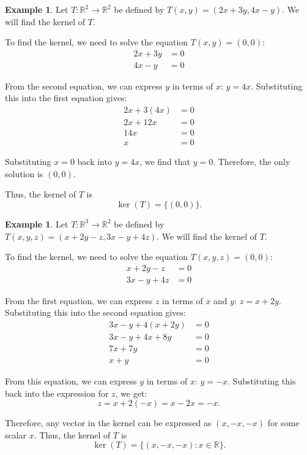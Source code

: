 \documentclass[11pt]{article}
\theoremstyle{definition}
\newtheorem{example}[definition]{Example}
\theoremstyle{plain}
\theoremstyle{remark}
\begin{document}
\begin{example}\label{ex:ker1}
    Let $T: \mathbb{R}^2 \to \mathbb{R}^2$ be defined by $T(x, y) = (2x + 3y, 4x - y)$. We will find the kernel of $T$.

    To find the kernel, we need to solve the equation $T(x, y) = (0, 0)$:
    \begin{align*}
        2x + 3y &= 0 \\
        4x - y &= 0
    \end{align*}

    From the second equation, we can express $y$ in terms of $x$: $y = 4x$. Substituting this into the first equation gives:
    \begin{align*}
        2x + 3(4x) &= 0 \\
        2x + 12x &= 0 \\
        14x &= 0 \\
        x &= 0
    \end{align*}

    Substituting $x = 0$ back into $y = 4x$, we find that $y = 0$. Therefore, the only solution is $(0, 0)$.

    Thus, the kernel of $T$ is
    \[\ker(T) = \{(0, 0)\}.\]
\end{example}

\begin{example}\label{ex:ker2}
    Let $T: \mathbb{R}^3 \to \mathbb{R}^2$ be defined by $T(x, y, z) = (x + 2y - z, 3x - y + 4z)$. We will find the kernel of $T$.

    To find the kernel, we need to solve the equation $T(x, y, z) = (0, 0)$:
    \begin{align*}
        x + 2y - z &= 0 \\
        3x - y + 4z &= 0
    \end{align*}

    From the first equation, we can express $z$ in terms of $x$ and $y$: $z = x + 2y$. Substituting this into the second equation gives:
    \begin{align*}
        3x - y + 4(x + 2y) &= 0 \\
        3x - y + 4x + 8y &= 0 \\
        7x + 7y &= 0 \\
        x + y &= 0
    \end{align*}

    From this equation, we can express $y$ in terms of $x$: $y = -x$. Substituting this back into the expression for $z$, we get:
    \[z = x + 2(-x) = x - 2x = -x.\]

    Therefore, any vector in the kernel can be expressed as $(x, -x, -x)$ for some scalar $x$. Thus, the kernel of $T$ is
    \[\ker(T) = \{(x, -x, -x) : x \in \mathbb{R}\}.\]
\end{example}
\end{document}
